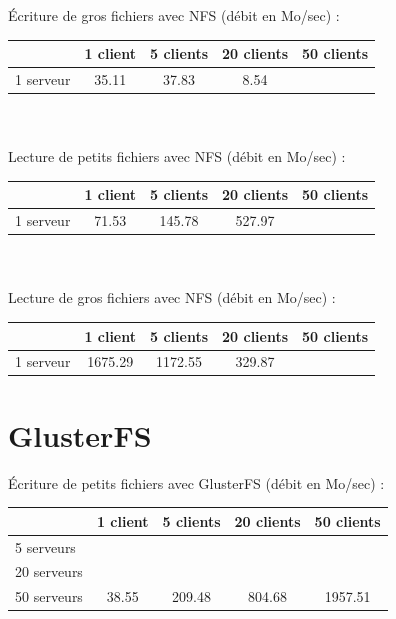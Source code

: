 \documentclass[12pt]{report}
\begin{document}
			Écriture de gros fichiers avec NFS (débit en Mo/sec) :

			\begin{tabular}{|l|c|c|c|c|}
				\hline
				& 1 client & 5 clients & 20 clients & 50 clients \\
				\hline
				1 serveur & 35.11 & 37.83 & 8.54 & \\
				\hline
			\end{tabular}\\\\

			Lecture de petits fichiers avec NFS (débit en Mo/sec) :

			\begin{tabular}{|l|c|c|c|c|}
				\hline
				& 1 client & 5 clients & 20 clients & 50 clients \\
				\hline
				 1 serveur & 71.53 & 145.78 & 527.97 & \\
				\hline
			\end{tabular}\\\\

			Lecture de gros fichiers avec NFS (débit en Mo/sec) :

			\begin{tabular}{|l|c|c|c|c|}
				\hline
				& 1 client & 5 clients & 20 clients & 50 clients \\
				\hline
				1 serveur & 1675.29 & 1172.55 & 329.87& \\
				\hline
			\end{tabular}

			\newpage

			\section{GlusterFS}

			Écriture de petits fichiers avec GlusterFS (débit en Mo/sec) :

			\begin{tabular}{|l|c|c|c|c|}
				\hline
				& 1 client & 5 clients & 20 clients & 50 clients \\
				\hline
				5 serveurs & & & & \\
				\hline
				20 serveurs & & & & \\
				\hline
				50 serveurs & 38.55 & 209.48 & 804.68 & 1957.51 \\
				\hline
			\end{tabular}\\\\
\end{document}
